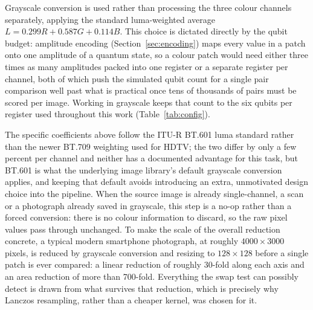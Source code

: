 \documentclass[conference]{IEEEtran}
\begin{document}
Grayscale conversion is used rather than processing the three colour channels separately, applying the standard luma-weighted average $L = 0.299R + 0.587G + 0.114B$. This choice is dictated directly by the qubit budget: amplitude encoding (Section~\ref{sec:encoding}) maps every value in a patch onto one amplitude of a quantum state, so a colour patch would need either three times as many amplitudes packed into one register or a separate register per channel, both of which push the simulated qubit count for a single pair comparison well past what is practical once tens of thousands of pairs must be scored per image. Working in grayscale keeps that count to the six qubits per register used throughout this work (Table~\ref{tab:config}).

The specific coefficients above follow the ITU-R BT.601 luma standard rather than the newer BT.709 weighting used for HDTV; the two differ by only a few percent per channel and neither has a documented advantage for this task, but BT.601 is what the underlying image library's default grayscale conversion applies, and keeping that default avoids introducing an extra, unmotivated design choice into the pipeline. When the source image is already single-channel, a scan or a photograph already saved in grayscale, this step is a no-op rather than a forced conversion: there is no colour information to discard, so the raw pixel values pass through unchanged. To make the scale of the overall reduction concrete, a typical modern smartphone photograph, at roughly $4000\times3000$ pixels, is reduced by grayscale conversion and resizing to $128\times128$ before a single patch is ever compared: a linear reduction of roughly 30-fold along each axis and an area reduction of more than 700-fold. Everything the swap test can possibly detect is drawn from what survives that reduction, which is precisely why Lanczos resampling, rather than a cheaper kernel, was chosen for it.
\end{document}
